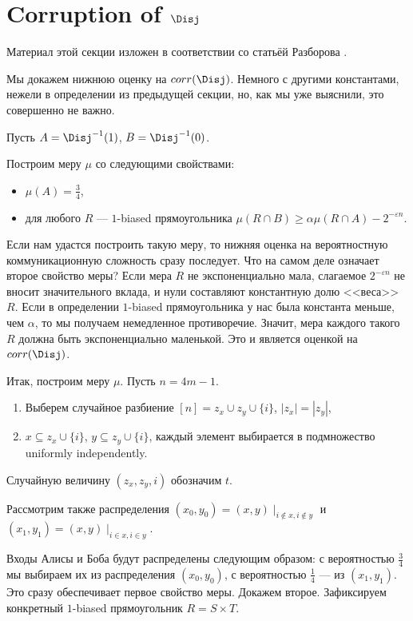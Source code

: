 \section{Corruption of $\Disj$}

Материал этой секции изложен в соответствии со статьёй Разборова \cite{Razborov92-disj}.

Мы докажем нижнюю оценку на $corr(\Disj)$. Немного с другими константами, нежели в определении из
предыдущей секции, но, как мы уже выяснили, это совершенно не важно.

Пусть $A = \Disj^{-1}(1)$, $B = \Disj^{-1}(0)$.

Построим меру $\mu$ со следующими свойствами:

\begin{itemize}
    \item $\mu(A) = \frac{3}{4}$,
    \item для любого $R$ --- $1$-biased прямоугольника $\mu(R \cap B) \ge \alpha \mu(R \cap A) -
        2^{-\varepsilon n}$.
\end{itemize}

Если нам удастся построить такую меру, то нижняя оценка на вероятностную коммуникационную сложность сразу
последует. Что на самом деле означает второе свойство меры? Если мера $R$ не экспоненциально мала,
слагаемое $2^{-\varepsilon n}$ не вносит значительного вклада, и нули составляют константную долю
<<веса>> $R$. Если в определении $1$-biased прямоугольника у нас была константа меньше, чем $\alpha$, то
мы получаем немедленное противоречие. Значит, мера каждого такого $R$ должна быть экспоненциально
маленькой. Это и является оценкой на $corr(\Disj)$. 

Итак, построим меру $\mu$. Пусть $n = 4m - 1$.

\begin{enumerate}
    \item Выберем случайное разбиение $[n] = z_x \cup z_y \cup \{i\}$, $|z_x| = |z_y|$,
    \item $x \subseteq z_x \cup \{i\}$, $y \subseteq z_y \cup \{i\}$, каждый элемент выбирается в
        подмножество uniformly independently.
\end{enumerate}

Случайную величину $(z_x, z_y, i)$ обозначим $t$.

Рассмотрим также распределения $(x_0, y_0) = (x, y) \mid_{i \notin x, i \notin y}$ и $(x_1, y_1) = (x, y)
\mid_{i \in x, i \in y}$.

Входы Алисы и Боба будут распределены следующим образом: с вероятностью $\frac{3}{4}$ мы выбираем их из
распределения $(x_0, y_0)$, с вероятностью $\frac{1}{4}$ --- из $(x_1, y_1)$. Это сразу обеспечивает
первое свойство меры. Докажем второе. Зафиксируем конкретный $1$-biased прямоугольник $R = S \times T$.

